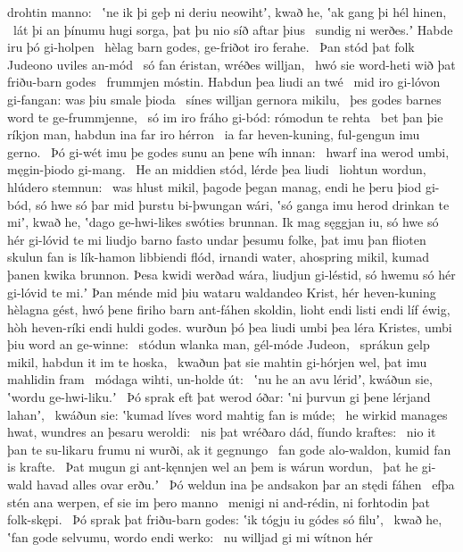 drohtin manno: \hld\ ʽne ik þi geþ ni deriu neowihtʼ, kwað he,
ʽak gang þi hél hinen, \hld\ lát þi an þínumu hugi sorga,
þat þu nio síð aftar þius \hld\ sundig ni werðes.ʼ
Habde iru þó gi-holpen \hld\ hèlag barn godes,
ge-friðot iro ferahe. \hld\ Þan stód þat folk Judeono
uviles an-mód \hld\ só fan éristan,
wréðes willjan, \hld\ hwó sie word-heti
wið þat friðu-barn godes \hld\ frummjen móstin.
Habdun þea liudi an twé \hld\ mid iro gi-lóvon gi-fangan:
was þiu smale þioda \hld\ sínes willjan
gernora mikilu, \hld\ þes godes barnes word
te ge-frummjenne, \hld\ só im iro fráho gi-bód:
rómodun te rehta \hld\ bet þan þie ríkjon man,
habdun ina far iro hérron \hld\ ia far heven-kuning,
ful-gengun imu gerno. \hld\ Þó gi-wét imu þe godes sunu
an þene wíh innan: \hld\ hwarf ina werod umbi,
męgin-þiodo gi-mang. \hld\ He an middien stód,
lérde þea liudi \hld\ liohtun wordun,
hlúdero stemnun: \hld\ was hlust mikil,
þagode þegan manag, endi he þeru þiod gi-bód,
só hwe só þar mid þurstu bi-þwungan wári,
ʽsó ganga imu herod drinkan te miʼ, kwað he, ʽdago ge-hwi-likes
swóties brunnan. Ik mag sęggjan iu,
só hwe só hér gi-lóvid te mi liudjo barno
fasto undar þesumu folke, þat imu þan flioten skulun
fan is lík-hamon libbiendi flód,
irnandi water, ahospring mikil,
kumad þanen kwika brunnon. Þesa kwidi werðad wára,
liudjun gi-léstid, só hwemu só hér gi-lóvid te mi.ʼ
Þan ménde mid þiu wataru waldandeo Krist,
hér heven-kuning hèlagna gést,
hwó þene firiho barn ant-fáhen skoldin,
lioht endi listi endi líf éwig,
hòh heven-ríki endi huldi godes.
wurðun þó þea liudi umbi þea léra Kristes,
umbi þiu word an ge-winne: \hld\ stódun wlanka man,
gél-móde Judeon, \hld\ sprákun gelp mikil,
habdun it im te hoska, \hld\ kwaðun þat sie mahtin gi-hórjen wel,
þat imu mahlidin fram \hld\ módaga wihti,
un-holde út: \hld\ ʽnu he an avu léridʼ, kwáðun sie,
ʽwordu ge-hwi-liku.ʼ \hld\ Þó sprak eft þat werod óðar:
ʽni þurvun gi þene lérjand lahanʼ, \hld\ kwáðun sie: ʽkumad líves word
mahtig fan is múde; \hld\ he wirkid manages hwat,
wundres an þesaru weroldi: \hld\ nis þat wréðaro dád,
fíundo kraftes: \hld\ nio it þan te su-likaru frumu ni wurði,
ak it gegnungo \hld\ fan gode alo-waldon,
kumid fan is krafte. \hld\ Þat mugun gi ant-kęnnjen wel
an þem is wárun wordun, \hld\ þat he gi-wald havad
alles ovar erðu.ʼ \hld\ Þó weldun ina þe andsakon þar
an stędi fáhen \hld\ efþa stén ana werpen,
ef sie im þero manno \hld\ menigi ni and-rédin,
ni forhtodin þat folk-skępi. \hld\ Þó sprak þat friðu-barn godes:
ʽik tógju iu gódes só filuʼ, \hld\ kwað he, ʽfan gode selvumu,
wordo endi werko: \hld\ nu willjad gi mi wítnon hér
